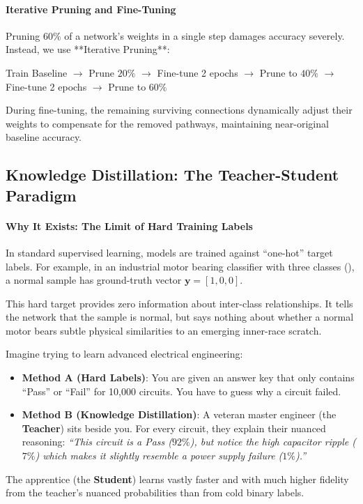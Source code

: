 \paragraph{Iterative Pruning and Fine-Tuning}
Pruning $60\%$ of a network's weights in a single step damages accuracy severely. Instead, we use **Iterative Pruning**:
\begin{center}
Train Baseline $\to$ Prune $20\%$ $\to$ Fine-tune 2 epochs $\to$ Prune to $40\%$ $\to$ Fine-tune 2 epochs $\to$ Prune to $60\%$
\end{center}
During fine-tuning, the remaining surviving connections dynamically adjust their weights to compensate for the removed pathways, maintaining near-original baseline accuracy.

\subsection{Knowledge Distillation: The Teacher-Student Paradigm}\label{subsec:knowledge_distillation}

\paragraph{Why It Exists: The Limit of Hard Training Labels}
In standard supervised learning, models are trained against ``one-hot'' target labels. For example, in an industrial motor bearing classifier with three classes (), a normal sample has ground-truth vector $\mathbf{y} = [1, 0, 0]$.

This hard target provides zero information about inter-class relationships. It tells the network that the sample is normal, but says nothing about whether a normal motor bears subtle physical similarities to an emerging inner-race scratch.

\begin{analogy}
Imagine trying to learn advanced electrical engineering:
\begin{itemize}
    \item \textbf{Method A (Hard Labels)}: You are given an answer key that only contains ``Pass'' or ``Fail'' for 10,000 circuits. You have to guess why a circuit failed.
    \item \textbf{Method B (Knowledge Distillation)}: A veteran master engineer (the \textbf{Teacher}) sits beside you. For every circuit, they explain their nuanced reasoning: \emph{``This circuit is a Pass ($92\%$), but notice the high capacitor ripple ($7\%$) which makes it slightly resemble a power supply failure ($1\%$).''}
\end{itemize}
The apprentice (the \textbf{Student}) learns vastly faster and with much higher fidelity from the teacher's nuanced probabilities than from cold binary labels.
\end{analogy}

